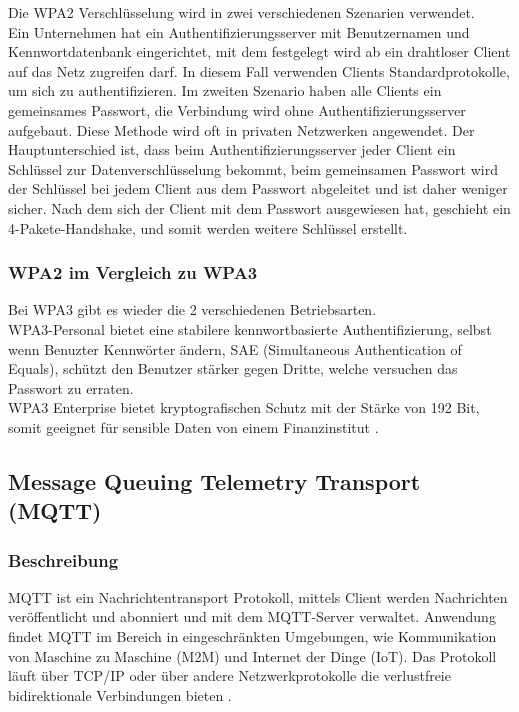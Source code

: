 Die WPA2 Verschlüsselung wird in zwei verschiedenen Szenarien verwendet.\\
Ein Unternehmen hat ein Authentifizierungsserver mit Benutzernamen und Kennwortdatenbank eingerichtet, mit dem festgelegt wird ab ein drahtloser Client auf das Netz zugreifen darf. In diesem Fall verwenden Clients Standardprotokolle, um sich zu authentifizieren.
Im zweiten Szenario haben alle Clients ein gemeinsames Passwort, die Verbindung wird ohne Authentifizierungsserver aufgebaut. Diese Methode wird oft in privaten Netzwerken angewendet. Der Hauptunterschied ist, dass beim Authentifizierungsserver jeder Client ein Schlüssel zur Datenverschlüsselung bekommt, beim gemeinsamen Passwort wird der Schlüssel bei jedem Client aus dem Passwort abgeleitet und ist daher weniger sicher.
Nach dem sich der Client mit dem Passwort ausgewiesen hat, geschieht ein 4-Pakete-Handshake, und somit werden weitere Schlüssel erstellt.  
\subsubsection{WPA2 im Vergleich zu WPA3}
Bei WPA3 gibt es wieder die 2 verschiedenen Betriebsarten.\\
WPA3-Personal bietet eine stabilere kennwortbasierte Authentifizierung, selbst wenn Benuzter Kennwörter ändern, SAE (Simultaneous Authentication of Equals), schützt den Benutzer stärker gegen Dritte, welche versuchen das Passwort zu erraten.\\
WPA3 Enterprise bietet kryptografischen Schutz mit der Stärke von 192 Bit, somit geeignet für sensible Daten von einem Finanzinstitut \cite{noauthor_wi-fi_nodate}.























\newpage
\subsection{Message Queuing Telemetry Transport (MQTT)}
\subsubsection{Beschreibung}
MQTT ist ein Nachrichtentransport Protokoll, mittels Client werden Nachrichten veröffentlicht und abonniert und mit dem MQTT-Server verwaltet. Anwendung findet MQTT im Bereich in eingeschränkten Umgebungen, wie Kommunikation von Maschine zu Maschine (M2M) und Internet der Dinge (IoT). Das Protokoll läuft über TCP/IP oder über andere Netzwerkprotokolle die verlustfreie bidirektionale Verbindungen bieten \cite{noauthor_mqtt-v5.0.pdf_nodate}. 

